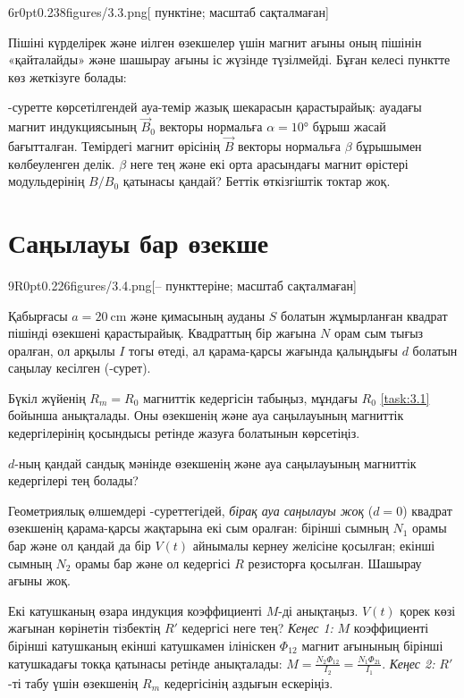 \pic6r{0pt}{0.238}{figures/3.3.png}[ пунктіне; масштаб сақталмаған]

Пішіні күрделірек және иілген өзекшелер үшін магнит ағыны оның пішінін «қайталайды» және шашырау ағыны іс жүзінде түзілмейді. Бұған келесі пунктте көз жеткізуге болады:
\begin{task}
    \item {}-суретте көрсетілгендей ауа-темір жазық шекарасын қарастырайық: ауадағы магнит индукциясының $\vec B_0$ векторы нормальға $\alpha=\ang{10}$ бұрыш жасай бағытталған. Темірдегі магнит өрісінің $\vec B$ векторы нормальға $\beta$ бұрышымен көлбеуленген делік. $\beta$ неге тең және екі орта арасындағы магнит өрістері модульдерінің $B/B_0$ қатынасы қандай? Беттік өткізгіштік токтар жоқ.
\end{task}

\part{Саңылауы бар өзекше}

\pic9R{0pt}{0.226}{figures/3.4.png}[-- пункттеріне; масштаб сақталмаған]

Қабырғасы $a=\qty{20}{\cm}$ және қимасының ауданы $S$ болатын жұмырланған квадрат пішінді өзекшені қарастырайық. Квадраттың бір жағына $N$ орам сым тығыз оралған, ол арқылы $I$ тогы өтеді, ал қарама-қарсы жағында қалыңдығы $d$ болатын саңылау кесілген (-сурет).

\begin{task}
    \item Бүкіл жүйенің $R_m=R_0$ магниттік кедергісін табыңыз, мұндағы $R_0$ \eqref{task:3.1} бойынша анықталады. Оны өзекшенің және ауа саңылауының магниттік кедергілерінің қосындысы ретінде жазуға болатынын көрсетіңіз.
\end{task}

\begin{task}
    \item $d$-ның қандай сандық мәнінде өзекшенің және ауа саңылауының магниттік кедергілері тең болады?
\end{task}
\newpage

Геометриялық өлшемдері -суреттегідей, \textit{бірақ ауа саңылауы жоқ} ($d=0$) квадрат өзекшенің қарама-қарсы жақтарына екі сым оралған: бірінші сымның $N_1$ орамы бар және ол қандай да бір $V(t)$ айнымалы кернеу желісіне қосылған; екінші сымның $N_2$ орамы бар және ол кедергісі $R$ резисторға қосылған. Шашырау ағыны жоқ.
\begin{task}
    \item Екі катушканың өзара индукция коэффициенті $M$-ді анықтаңыз. $V(t)$ қорек көзі жағынан көрінетін тізбектің $R'$ кедергісі неге тең? \textit{Кеңес 1:} $M$ коэффициенті бірінші катушканың екінші катушкамен ілініскен $\Phi_{12}$ магнит ағынының бірінші катушкадағы токқа қатынасы ретінде анықталады: $M=\frac{N_2\Phi_{12}}{I_2}=\frac{N_1\Phi_{21}}{I_1}$. \textit{Кеңес 2:} $R'$-ті табу үшін өзекшенің $R_m$ кедергісінің аздығын ескеріңіз.
\end{task}

